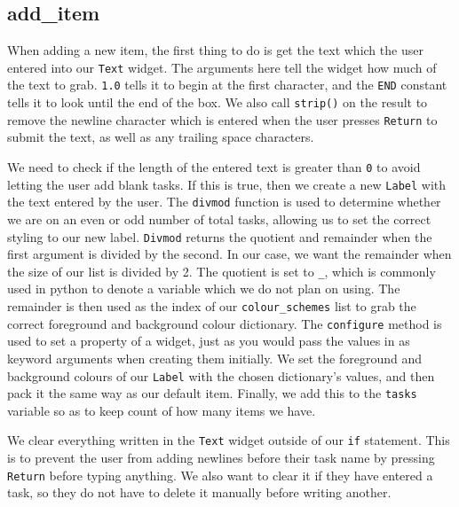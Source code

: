 \documentclass[a4paper,11pt,openany]{book}
\begin{document}
\subsection{add\_item}

When adding a new item, the first thing to do is get the text which the user entered into our \lstinline[columns=fixed]{Text} widget. The arguments here tell the widget how much of the text to grab. \lstinline[columns=fixed]{1.0} tells it to begin at the first character, and the \lstinline[columns=fixed]{END} constant tells it to look until the end of the box. We also call \lstinline[columns=fixed]{strip()} on the result to remove the newline character which is entered when the user presses \lstinline[columns=fixed]{Return} to submit the text, as well as any trailing space characters. 

\vspace{5mm}

We need to check if the length of the entered text is greater than \lstinline[columns=fixed]{0} to avoid letting the user add blank tasks. If this is true, then we create a new \lstinline[columns=fixed]{Label} with the text entered by the user. The \lstinline[columns=fixed]{divmod} function is used to determine whether we are on an even or odd number of total tasks, allowing us to set the correct styling to our new label. \lstinline[columns=fixed]{Divmod} returns the quotient and remainder when the first argument is divided by the second. In our case, we want the remainder when the size of our list is divided by 2. The quotient is set to \lstinline[columns=fixed]{_}, which is commonly used in python to denote a variable which we do not plan on using. The remainder is then used as the index of our \lstinline[columns=fixed]{colour_schemes} list to grab the correct foreground and background colour dictionary. The \lstinline[columns=fixed]{configure} method is used to set a property of a widget, just as you would pass the values in as keyword arguments when creating them initially. We set the foreground and background colours of our \lstinline[columns=fixed]{Label} with the chosen dictionary's values, and then pack it the same way as our default item. Finally, we add this to the \lstinline[columns=fixed]{tasks} variable so as to keep count of how many items we have.

\vspace{5mm}

We clear everything written in the \lstinline[columns=fixed]{Text} widget outside of our \lstinline[columns=fixed]{if} statement. This is to prevent the user from adding newlines before their task name by pressing \lstinline[columns=fixed]{Return} before typing anything. We also want to clear it if they have entered a task, so they do not have to delete it manually before writing another. 
\end{document}

